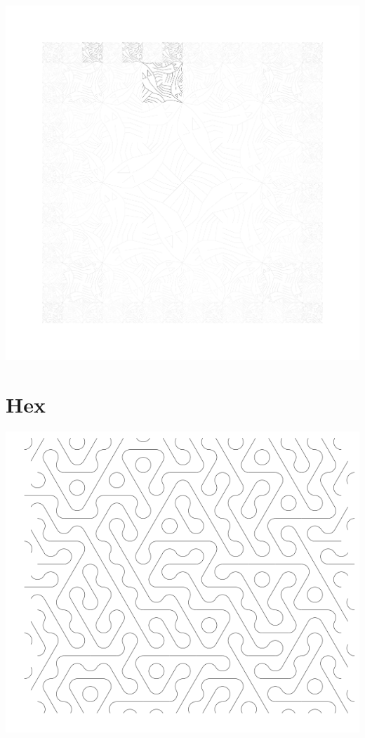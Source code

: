 \documentclass{article}%
\begin{document}
\includegraphics[width=\textwidth]{examples/output/escher-square-limit.pdf}
\pagebreak

\section{Hex}

\includegraphics[width=\textwidth]{examples/output/hex-variation.png}
\end{document}

